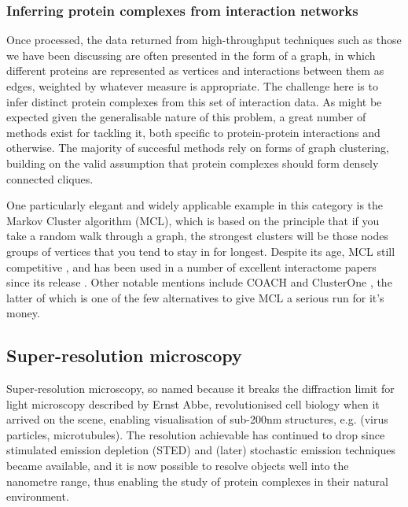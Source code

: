 \documentclass[a4paper,11pt,twoside,openright]{scrbook}
\begin{document}

\subsubsection{Inferring protein complexes from interaction networks}
Once processed, the data returned from high-throughput techniques such as those we have been discussing are often presented in the form of a graph, in which different proteins are represented as vertices and interactions between them as edges, weighted by whatever measure is appropriate. The challenge here is to infer distinct protein complexes from this set of interaction data. As might be expected given the generalisable nature of this problem, a great number of methods exist for tackling it, both specific to protein-protein interactions and otherwise. The majority of succesful methods rely on forms of graph clustering, building on the valid assumption that protein complexes should form densely connected cliques.

One particularly elegant and widely applicable example in this category is the Markov Cluster algorithm \cite{VanDongen2000} (MCL), which is based on the principle that if you take a random walk through a graph, the strongest clusters will be those nodes groups of vertices that you tend to stay in for longest. Despite its age, MCL still competitive \cite{Li2010}, and has been used in a number of excellent interactome papers since its release \cite{Krogan2006,Wan2015}. Other notable mentions include COACH and ClusterOne \cite{Wu2009,Nepusz2012}, the latter of which is one of the few alternatives to give MCL a serious run for it's money.

\subsection{Super-resolution microscopy}
Super-resolution microscopy, so named because it breaks the diffraction limit for light microscopy described by Ernst Abbe, revolutionised cell biology when it arrived on the scene, enabling visualisation of sub-200nm structures, e.g. (virus particles, microtubules). The resolution achievable has continued to drop since stimulated emission depletion \cite{Hell1994} (STED) and (later) stochastic emission techniques became available, and it is now possible to resolve objects well into the nanometre range, thus enabling the study of protein complexes in their natural environment.
\end{document}
